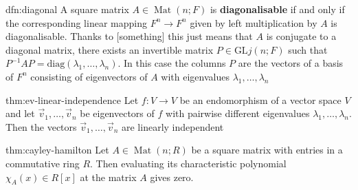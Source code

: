 \documentclass[landscape, 8pt]{extarticle}
\DeclareMathOperator{\Mat}{Mat}
\begin{document}
\begin{multicols}{3}
\begin{dfn}[Diagonalisability]{dfn:diagonal}{}
    A square matrix $A\in \Mat(n;F)$ is \textbf{diagonalisable} if and only if the corresponding linear mapping $F^{n}\to F^{n}$ given by left multiplication by $A$ is diagonalisable. Thanks to [something] this just means that $A$ is conjugate to a diagonal matrix, there exists an invertible matrix $P \in \text{GL}j(n;F)$ such that $P^{-1}AP = \text{diag}(\lambda_{1},\dots,\lambda_{n})$. In this case the columns $P$ are the vectors of a basis of $F^{n}$ consisting of eigenvectors of $A$ with eigenvalues $\lambda_{1},\dots,\lambda_{n}$
\end{dfn}

\begin{thm}{thm:ev-linear-independence}{}
    Let $f : V\to V$ be an endomorphism of a vector space $V$ and let $\vec{v}_{1},\dots,\vec{v}_{n}$ be eigenvectors of $f$ with pairwise different eigenvalues $\lambda_{1},\dots,\lambda_{n}$. Then the vectors $\vec{v}_{1},\dots,\vec{v}_{n}$ are linearly independent
\end{thm}

\begin{thm}{thm:cayley-hamilton}{}
    Let $A\in \Mat(n;R)$ be a square matrix with entries in a commutative ring $R$. Then evaluating its characteristic polynomial $\chi_{A}(x)\in R[x]$ at the matrix $A$ gives zero.
\end{thm}


\lipsum[1-12]

\end{multicols}
\end{document}

